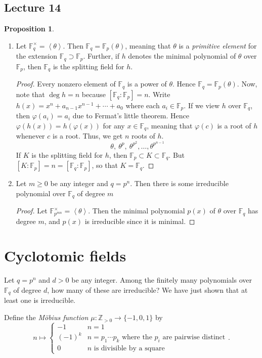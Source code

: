 \documentclass[10pt,letterpaper,cm]{nupset}
\theoremstyle{definition}
\theoremstyle{theorem}
\newtheorem{prop}[definition]{Proposition}
\theoremstyle{remark}
\newcommand{\F}{\mathbb F}
\newcommand{\Z}{\mathbb Z}
\newcommand{\1}{\mathbf{1}}
\newcommand{\0}{\vec 0}
\begin{document}
\subsection{Lecture 14}

\begin{prop} $ $
\begin{enumerate}
\item Let $\F_q^{\times} = \left\langle \theta \right\rangle$. Then $\F_q =\F_p(\theta)$, meaning that $\theta$ is a \textit{primitive element} for the extension $\F_q \supset \F_p$. Further, if $h$ denotes the minimal polynomial of $\theta$ over $\F_p$, then $\F_q$ is the splitting field for $h$.
\begin{proof}
Every nonzero element of $\F_q$ is a power of $\theta$. Hence $\F_q = \F_p(\theta)$. Now, note that $\deg{h} = n$ because $\left[\F_q : \F_p\right]=n$. Write $h(x) = x^n +a_{n-1}x^{n-1}+\cdots + a_0$ where each $a_i \in \F_p$. If we view $h$ over $\F_q$, then $\varphi(a_i) = a_i$ due to Fermat's little theorem. Hence $\varphi(h(x)) = h(\varphi(x))$ for any $x\in \F_q$, meaning that $\varphi(c)$ is a root of $h$ whenever $c$ is a root. Thus, we get $n$ roots of $h$. $$ \theta, \ \theta^p, \ \theta^{p^2}, \ldots, \theta^{p^{n-1}}   $$ If $K$ is the splitting field for $h$, then $\F_p \subset K \subset \F_q$. But $[K :\F_p] = n = [\F_q: \F_p]$, so that $K = \F_q$.
\end{proof}
\item Let $m\geq 0$ be any integer and $q=p^n$. Then there is some irreducible polynomial over $\F_q$ of degree $m$
\begin{proof}
Let $\F_{p^{mn}}^{\times}=\left\langle \theta \right\rangle $. Then the minimal polynomial $p(x)$ of $\theta$ over $\F_q$ has degree $m$, and $p(x)$ is irreducible since it is minimal.
\end{proof}
\end{enumerate}
\end{prop}

\section{Cyclotomic fields}


Let $q=p^n$ and $d>0$ be any integer. Among the finitely many polynomials over $\F_q$ of degree $d$, how many of these are irreducible? We have just shown that at least one is irreducible. 


\medskip

Define the \textit{M\"{o}bius function $\mu : \Z_{>0} \to \{{-1}, 0, 1\}$} by 
\[
n \mapsto \begin{cases} {-1} & n=1\\ ({-1})^k & n = p_1\cdots p_k \text{ where the } p_i \text{ are pairwise distinct} \\ 0 & n \text{ is divisible by a square}     \end{cases}    .
\]
\end{document}
